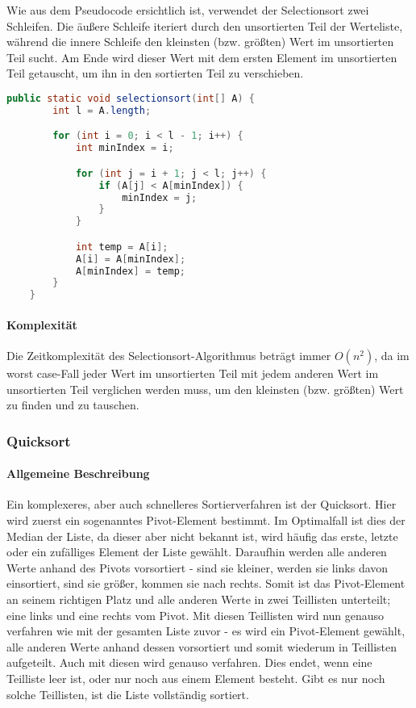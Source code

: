 \documentclass{article}
\begin{document}
	Wie aus dem Pseudocode ersichtlich ist, verwendet der Selectionsort zwei Schleifen. Die äußere Schleife iteriert durch den unsortierten Teil der Werteliste, während die innere Schleife den kleinsten (bzw. größten) Wert im unsortierten Teil sucht. Am Ende wird dieser Wert mit dem ersten Element im unsortierten Teil getauscht, um ihn in den sortierten Teil zu verschieben.

	\begin{lstlisting}[language=Java, caption=Der Selectionsort-Algorithmus in Java]
	public static void selectionsort(int[] A) {
		int l = A.length;

		for (int i = 0; i < l - 1; i++) {
			int minIndex = i;

			for (int j = i + 1; j < l; j++) {
				if (A[j] < A[minIndex]) {
					minIndex = j;
				}
			}

			int temp = A[i];
			A[i] = A[minIndex];
			A[minIndex] = temp;
		}
	}
	\end{lstlisting}

	\paragraph{Komplexität}
	Die Zeitkomplexität des Selectionsort-Algorithmus beträgt immer \textbf{$O(n^2)$}, da im worst case-Fall jeder Wert im unsortierten Teil mit jedem anderen Wert im unsortierten Teil verglichen werden muss, um den kleinsten (bzw. größten) Wert zu finden und zu tauschen.
	
	\subsubsection{Quicksort}
	
	\paragraph{Allgemeine Beschreibung}
	
	Ein komplexeres, aber auch schnelleres Sortierverfahren ist der Quicksort. Hier wird zuerst ein sogenanntes Pivot-Element bestimmt. Im Optimalfall ist dies der Median der Liste, da dieser aber nicht bekannt ist, wird häufig das erste, letzte oder ein zufälliges Element der Liste gewählt. Daraufhin werden alle anderen Werte anhand des Pivots vorsortiert - sind sie kleiner, werden sie links davon einsortiert, sind sie größer, kommen sie nach rechts. Somit ist das Pivot-Element an seinem richtigen Platz und alle anderen Werte in zwei Teillisten unterteilt; eine links und eine rechts vom Pivot. Mit diesen Teillisten wird nun genauso verfahren wie mit der gesamten Liste zuvor - es wird ein Pivot-Element gewählt, alle anderen Werte anhand dessen vorsortiert und somit wiederum in Teillisten aufgeteilt. Auch mit diesen wird genauso verfahren. Dies endet, wenn eine Teilliste leer ist, oder nur noch aus einem Element besteht. Gibt es nur noch solche Teillisten, ist die Liste vollständig sortiert. 
	
\end{document}
